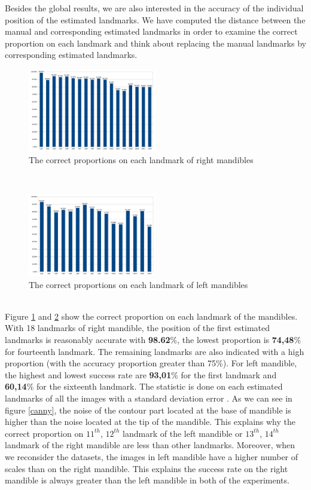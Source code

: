 \documentclass[twoside,twocolumn,10pt]{article}
\begin{document}
Besides the global results, we are also
interested in the accuracy of the individual position of the estimated landmarks. We have computed the distance between the manual and corresponding estimated landmarks in order to examine the correct proportion on each landmark and think about replacing the manual landmarks by corresponding estimated landmarks.
\begin{figure}[htb]
    \centering
    \includegraphics[width=0.5\textwidth]{./images/md_chartlms}
    \caption{The correct proportions on each landmark of right mandibles }
    \label{figmdresultlm}
\end{figure}~\\
\begin{figure}[htb]
    \centering
    \includegraphics[width=0.5\textwidth]{./images/mg_chartlms}
    \caption{The correct proportions on each landmark of left mandibles }
    \label{figmgresultlm}
\end{figure}~\\
Figure \ref{figmdresultlm} and \ref{figmgresultlm} show the correct proportion on each landmark of the mandibles. With 18 landmarks of right mandible, the position of the first estimated landmarks is reasonably accurate with \textbf{98.62}\%, the lowest proportion is \textbf{74,48}\% for fourteenth landmark. The remaining landmarks are also indicated with a high proportion (with the accuracy proportion greater than 75\%). For left mandible, the highest and lowest success rate are \textbf{93,01}\% for the first landmark and \textbf{60,14}\% for the sixteenth landmark. The statistic is done on each estimated landmarks of all the images with a standard deviation error \cite{bland1996statistics}. As we can see in figure \ref{canny}, the noise of the contour part located at the base of mandible is higher than the noise located at the tip of the mandible. This explains why the correct proportion on $11^{th}$, $12^{th}$ landmark of the left mandible or $13^{th}$, $14^{th}$ landmark of the right mandible are less than other landmarks. Moreover, when we reconsider the datasets, the images in left mandible have a higher number of scales than on the right mandible. This explains the success rate on the right mandible is always greater than the left mandible in both of the experiments.\\
\end{document}
